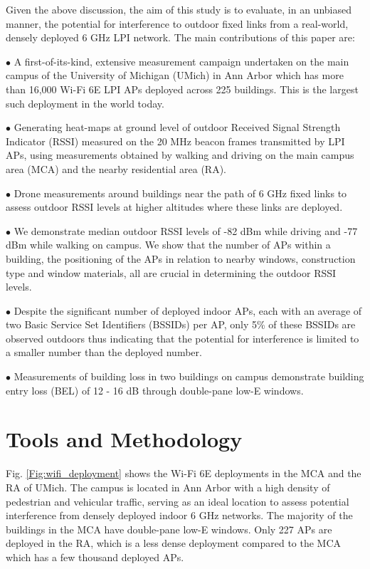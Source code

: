 \documentclass[sigconf,10pt]{acmart}
\begin{document}
Given the above discussion, the aim of this study is to evaluate, in an unbiased manner, the potential for interference to outdoor fixed links from a real-world, densely deployed 6 GHz LPI network. The main contributions of this paper are:

\noindent $\bullet$
A first-of-its-kind, extensive measurement campaign undertaken on the main campus of the University of Michigan (UMich) in Ann Arbor which has more than 16,000 Wi-Fi 6E LPI APs deployed across 225 buildings. This is the largest such deployment in the world today.

\noindent $\bullet$
Generating heat-maps at ground level of outdoor Received Signal Strength Indicator (RSSI) measured on the 20 MHz beacon frames transmitted by LPI APs, using measurements obtained by walking and driving on the main campus area (MCA) and the nearby residential area (RA). 

\noindent $\bullet$
Drone measurements around buildings near the path of 6 GHz fixed links to assess outdoor RSSI levels at higher altitudes where these links are deployed.

\noindent $\bullet$
We demonstrate median outdoor RSSI levels of -82 dBm while driving and -77 dBm while walking on campus. We show that the number of APs within a building, the positioning of the APs in relation to nearby windows, construction type and window materials, all are crucial in determining the outdoor RSSI levels. 

\noindent $\bullet$
Despite the significant number of deployed indoor APs, each with an average of two Basic Service Set Identifiers (BSSIDs) per AP, only 5\% of these BSSIDs are observed outdoors thus indicating that the potential for interference is limited to a smaller number than the deployed number.

\noindent $\bullet$
Measurements of building loss in two buildings on campus demonstrate building entry loss (BEL) of 12 - 16 dB through double-pane low-E windows. 

\section{Tools and Methodology}

 Fig. \ref{Fig:wifi_deployment} shows the Wi-Fi 6E deployments in the MCA and the RA of UMich. The campus is located in Ann Arbor with a high density of pedestrian and vehicular traffic, serving as an ideal location to assess potential interference from densely deployed indoor 6 GHz networks. The majority of the buildings in the MCA have double-pane low-E windows. Only 227 APs are deployed in the RA, which is a less dense deployment compared to the MCA which has a few thousand deployed APs.
\end{document}
